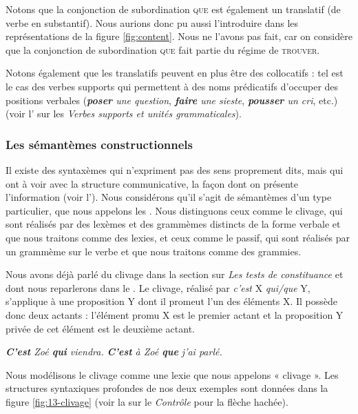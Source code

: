 Notons que la conjonction de subordination \textsc{que} est également un translatif (de verbe en substantif). Nous aurions donc pu aussi l’introduire dans les représentations de la figure \ref{fig:content}. Nous ne l’avons pas fait, car on considère que la conjonction de subordination \textsc{que} fait partie du régime de \textsc{trouver}.

Notons également que les translatifs peuvent en plus être des collocatifs : tel est le cas des verbes supports qui permettent à des noms prédicatifs d’occuper des positions verbales (\textit{\textbf{poser} une question}, \textit{\textbf{faire} une sieste}, \textit{\textbf{pousser} un cri}, etc.) (voir l’ sur les \textit{Verbes supports et unités grammaticales}).

\subsubsection{Les sémantèmes constructionnels} 
Il existe des syntaxèmes qui n’expriment pas des sens proprement dits, mais qui ont à voir avec la structure communicative, la façon dont on présente l’information (voir l’). Nous considérons qu’il s’agit de sémantèmes d’un type particulier, que nous appelons les . Nous distinguons ceux comme le clivage, qui sont réalisés par des lexèmes et des grammèmes distincts de la forme verbale et que nous traitons comme des lexies, et ceux comme le passif, qui sont réalisés par un grammème sur le verbe et que nous traitons comme des grammies.

Nous avons déjà parlé du clivage dans la section  sur \textit{Les tests de constituance} et dont nous reparlerons dans le . Le clivage, réalisé par \textit{c’est} X \textit{qui/que} Y, s’applique à une proposition Y dont il promeut l’un des éléments X. Il possède donc deux actants : l’élément promu X est le premier actant et la proposition Y privée de cet élément est le deuxième actant.

\ea\label{ex:13-clivage}
\ea \textit{\textbf{C’est} Zoé \textbf{qui} viendra.}
\ex \textit{\textbf{C’est} à Zoé \textbf{que} j’ai parlé.}\z\z

Nous modélisons le clivage comme une lexie que nous appelons « clivage ». Les structures syntaxiques profondes de nos deux exemples sont données dans la figure \ref{fig:13-clivage} (voir la  sur le \textit{Contrôle} pour la flèche hachée).

